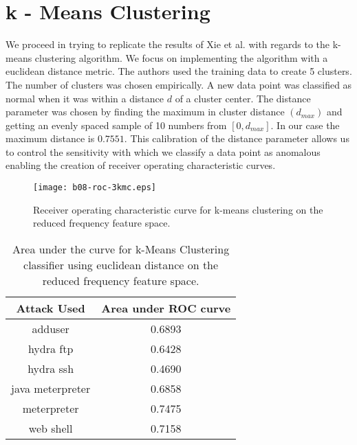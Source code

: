 \documentclass[reqno,openany,12pt]{amsbook}
\begin{document}


\section{k - Means Clustering}


We proceed in trying to replicate the results of Xie et al.\cite{adf1} with regards to the k-means clustering algorithm. We focus on implementing the algorithm with a euclidean distance metric. The authors used the training data to create 5 clusters. The number of clusters was chosen empirically. A new data point was classified as normal when it was within a distance $d$ of a cluster center. The distance parameter was chosen by finding the maximum in cluster distance $(d_{max})$ and getting an evenly spaced sample of 10 numbers from $[0,d_{max}]$. In our case the maximum distance is $0.7551$. This calibration of the distance parameter allows us to control the sensitivity with which we classify a data point as anomalous enabling the creation of receiver operating characteristic curves.

\begin{figure}
\texttt{[image: b08-roc-3kmc.eps]}
\caption[Receiver operating characteristic curve for k-means clustering.]{Receiver operating characteristic curve for k-means clustering on the reduced frequency feature space.}
\label{kmcroc1}
\end{figure}

\begin{table}
\begin{tabular}{|c|c|}
\hline
Attack Used &  Area under ROC curve \\ \hline 
adduser          & 0.6893 \\ \hline
hydra ftp        & 0.6428 \\ \hline
hydra ssh        & 0.4690 \\ \hline
java meterpreter & 0.6858 \\ \hline
meterpreter      & 0.7475 \\ \hline
web shell        & 0.7158 \\ \hline
\end{tabular}
\vspace{5pt}
\caption[Area under the curve for k-Means Clustering classifier using euclidean distance.]{Area under the curve for k-Means Clustering classifier using euclidean distance on the reduced frequency feature space.}
\label{kmct1}
\end{table}
\end{document}
